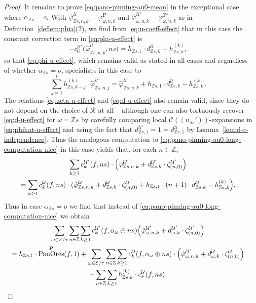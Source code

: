 \documentclass[10pt,a4paper]{amsart}
\DeclareMathOperator{\pano}{PanOres}
\newcommand{\Ca}{\mathcal{C}} %
\newcommand{\Z}{\mathbb{Z}} %
\newcommand{\ec}{\mathcal{E}} %
\newcommand{\idec}{{o}} %
\newcommand{\orbita}{{\ec/\tau}} %
\newcommand{\za}[2]{\zeta^{\mathcal{U}}_{( {#1} , {#2} )}}
\begin{document}
\begin{proof}
    It remains to prove \eqref{eq:pano-pinning-au0-mean} in the exceptional case where $\alpha_{\Z s}=\idec$. With $\hat{\varphi}^\mathcal{U}_{\Z s,n,k}=\varphi^\mathbf{P}_{\omega,n,k}$ and $\hat{\varphi}^{\mathcal{U}'}_{\omega,n,k}=\varphi^{\mathbf{P}'}_{\omega,n,k}$ as in Definition~\ref{deflem:phia}(2), we find from \eqref{eq:u-coeff-effect} that in this case the constant correction term in \eqref{eq:phi-u-effect} is \begin{equation}\label{eq:pano-pinning-au0-phihat-constant}
        -c_0^{\mathcal{U}'}\bigl(\hat{\varphi}^\mathcal{U}_{\Z s,n,k},ns\bigr)=h_{\Z s, 1}\cdot d^\mathcal{U}_{\Z s,k}-h^{(k)}_{\Z s,k},
    \end{equation} so that \eqref{eq:phi-u-effect}, which remains valid as stated in all cases and regardless of whether $\alpha_{\Z s}=\idec$, specializes in this case to
    \begin{equation}\label{eq:phihat-u-effect}
        \sum_{j=1}^k h^{(k)}_{\Z s,k-j}\cdot\hat{\varphi}^{\mathcal{U}'}_{\Z s,n,j}=\hat{\varphi}^\mathcal{U}_{\Z s,n,k}+h_{\Z s,1}\cdot d^\mathcal{U}_{\Z s,k}-h^{(k)}_{\Z s,k}.
    \end{equation} The relations \eqref{eq:zeta-u-effect} and \eqref{eq:d-u-effect} also remain valid, since they do not depend on the choice of $\mathcal{R}$ at all -- although one can also tortuously recover \eqref{eq:d-u-effect} for $\omega=\Z s$ by carefully comparing local $\Ca((u_{ns}'))$-expansions in \eqref{eq:phihat-u-effect} and using the fact that $d^{\mathcal{U}'}_{\Z s,1}=1=d^\mathcal{U}_{\Z s,1}$ by Lemma~\ref{lem:d-r-independence}. Thus the analogous computation to \eqref{eq:pano-pinning-au0-long-computation-nice} in this case yields that, for each $n\in\Z$,
\begin{gather}\label{eq:pano-pinning-au0-long-computation-mean} \sum_{k\geq 1}c^{\mathcal{U}'}_k(f,ns)\cdot\Bigl(\hat{\varphi}^{\mathcal{U}'}_{\Z s,n,k}+d^{\mathcal{U}'}_{\Z s,k}\cdot\zeta^{\mathcal{U}'}_{(n,0)}\Bigr)\\
=\sum_{k\geq 1}c^\mathcal{U}_k(f,ns)\cdot(\hat{\varphi}^\mathcal{U}_{\Z s,n,k}+d^\mathcal{U}_{\Z s,k}\cdot\za{n}{0}+h_{\Z s,1}\cdot(n+1)\cdot d^\mathcal{U}_{\Z s,k} -h^{(k)}_{\Z s,k}\Bigr).\notag
\end{gather} Thus in case $\alpha_{\Z s}=\idec$ we find that instead of \eqref{eq:pano-pinning-au0-long-computation-nice} we obtain
\begin{multline} \label{eq:pano-pinning-au0-long-computation-mean-result}
    \sum_{\omega\in\orbita}\sum_{n\in\Z}\sum_{k\geq 1}c^{\mathcal{U}'}_k(f,\alpha_\omega\oplus ns)\Bigl(\hat{\varphi}^{\mathcal{U}'}_{\omega,n,k}+d^{\mathcal{U}'}_{\omega,k}\cdot\zeta^{\mathcal{U}'}_{(n,0)}\Bigr)\\=h_{\Z s,1}\cdot\pano^\mathbf{P}(f,1)+\sum_{\omega\in\orbita}\sum_{n\in\Z}\sum_{k\geq 1}c^{\mathcal{U}}_k(f,\alpha_\omega\oplus ns)\cdot\Bigl(\hat{\varphi}^{\mathcal{U}'}_{\omega,n,k}+d^{\mathcal{U}}_{\omega,k}\cdot\zeta^{\mathcal{U}}_{(n,0)}\Bigr)\\-\sum_{n\in\Z}\sum_{k\geq 1}h^{(k)}_{\Z s,k}\cdot c^\mathcal{U}_k(f,ns).

\end{multline}
\end{proof}
\end{document}
